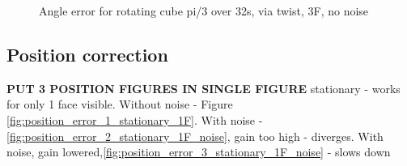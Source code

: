 \begin{figure}
\centering
 	\caption{Angle error for rotating cube pi/3 over 32s, via twist, 3F, no noise}
 	\label{fig:angle_error_1_rotating_noise}
\end{figure}

\subsection{Position correction}
\textbf{PUT 3 POSITION FIGURES IN SINGLE FIGURE}
stationary - works for only 1 face visible. Without noise - Figure \ref{fig:position_error_1_stationary_1F}. With noise - \ref{fig:position_error_2_stationary_1F_noise}, gain too high - diverges. 
With noise, gain lowered,\ref{fig:position_error_3_stationary_1F_noise} - slows down

